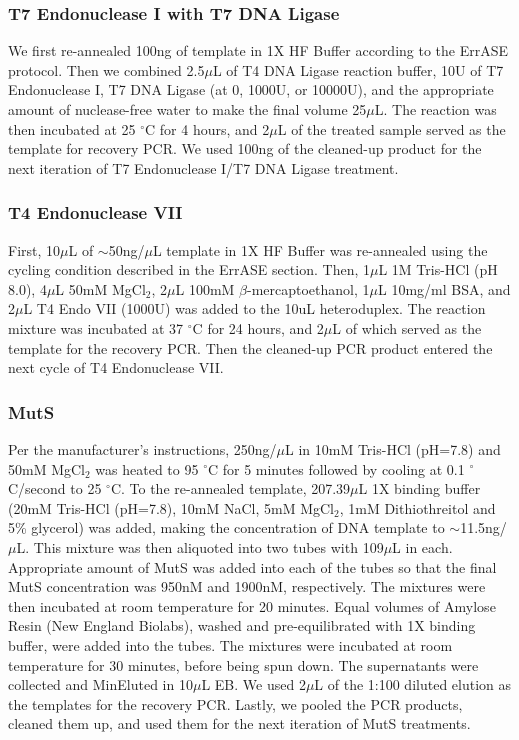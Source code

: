\documentclass[letterpaper,12pt]{article}
\begin{document}
\subsubsection*{T7 Endonuclease I with T7 DNA Ligase}
We first re-annealed 100ng of template in 1X HF Buffer according to the ErrASE protocol. Then we combined 2.5$\mu$L of T4 DNA Ligase reaction buffer, 10U of T7 Endonuclease I, T7 DNA Ligase (at 0, 1000U, or 10000U), and the appropriate amount of nuclease-free water to make the final volume 25$\mu$L. The reaction was then incubated at 25 $^{\circ}$C for 4 hours, and 2$\mu$L of the treated sample served as the template for recovery PCR. We used 100ng of the cleaned-up product for the next iteration of T7 Endonuclease I/T7 DNA Ligase treatment.

\subsubsection*{T4 Endonuclease VII}
First, 10$\mu$L of $\sim$50ng/$\mu$L template in 1X HF Buffer was re-annealed using the cycling condition described in the ErrASE section. Then, 1$\mu$L 1M Tris-HCl (pH 8.0), 4$\mu$L 50mM MgCl$_2$, 2$\mu$L 100mM $\beta$-mercaptoethanol, 1$\mu$L 10mg/ml BSA, and 2$\mu$L T4 Endo VII (1000U) was added to the 10uL heteroduplex. The reaction mixture was incubated at 37 $^{\circ}$C for 24 hours, and 2$\mu$L of which served as the template for the recovery PCR. Then the cleaned-up PCR product entered the next cycle of T4 Endonuclease VII.

\subsubsection*{MutS}
Per the manufacturer’s instructions, 250ng/$\mu$L in 10mM Tris-HCl (pH=7.8) and 50mM MgCl$_2$ was heated to 95 $^{\circ}$C for 5 minutes followed by cooling at 0.1 $^{\circ}$C/second to 25 $^{\circ}$C. To the re-annealed template, 207.39$\mu$L 1X binding buffer (20mM Tris-HCl (pH=7.8), 10mM NaCl, 5mM MgCl$_2$, 1mM Dithiothreitol and 5\% glycerol) was added, making the concentration of DNA template to $\sim$11.5ng/$\mu$L. This mixture was then aliquoted into two tubes with 109$\mu$L in each. Appropriate amount of MutS was added into each of the tubes so that the final MutS concentration was 950nM and 1900nM, respectively. The mixtures were then incubated at room temperature for 20 minutes. Equal volumes of Amylose Resin (New England Biolabs), washed and pre-equilibrated with 1X binding buffer, were added into the tubes. The mixtures were incubated at room temperature for 30 minutes, before being spun down. The supernatants were collected and MinEluted in 10$\mu$L EB. We used 2$\mu$L of the 1:100 diluted elution as the templates for the recovery PCR. Lastly, we pooled the PCR products, cleaned them up, and used them for the next iteration of MutS treatments.
\end{document}
